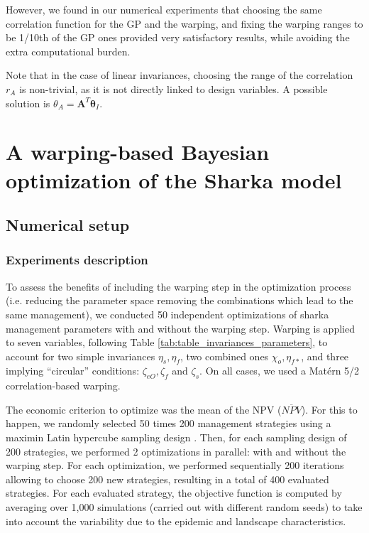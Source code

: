 However, we found in our numerical experiments that choosing the same correlation function for the GP and the warping, and fixing 
the warping ranges to be 1/10th of the GP ones provided very satisfactory results, while avoiding the extra computational burden.

Note that in the case of linear invariances, choosing the range of the correlation $r_A$ is non-trivial, as it is not directly linked to design variables. 
A possible solution is $\theta_A = \mathbf{A}^T \boldsymbol{\theta}_I$. 

\section{A warping-based Bayesian optimization of the Sharka model}\label{sec:sharka}

\subsection{Numerical setup}

\subsubsection{Experiments description}

To assess the benefits of including the warping step in the optimization process (i.e. reducing the parameter space removing the combinations which lead to the same management), 
we conducted 50 independent optimizations of sharka management parameters with and without the warping step. 
Warping is applied to seven variables, following Table \ref{tab:table_invariances_parameters}, to account for two simple invariances $\eta_s, \eta_f$, two combined ones $\chi_o, \eta_{f*}$, and three implying ``circular'' conditions:
$\zeta_{eO}, \zeta_{f}$ and $\zeta_{s}$. On all cases, we used a Mat\'ern 5/2 correlation-based warping. 

The economic criterion to optimize was the mean of the NPV ($\overline{NPV}$).
For this to happen, we randomly selected 50 times 200 management strategies using a maximin Latin hypercube sampling design \cite{fang2005design}. 
Then, for each sampling design of 200 strategies, we performed 2 optimizations in parallel: with and without the warping step. 
For each optimization, we performed sequentially 200 iterations allowing to choose 200 new strategies, resulting in a total of 400 evaluated strategies.
For each evaluated strategy, the objective function is computed by averaging over 1,000 simulations (carried out with different random seeds) 
to take into account the variability due to the epidemic and landscape characteristics.

